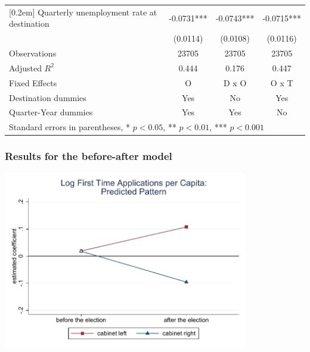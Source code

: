 \documentclass[compress, xcolor = {table,xcdraw}]{beamer}
\begin{document}
\begin{frame}
\begin{table}
\begin{tabular}{l*{3}{c}}
		[0.2em]
		Quarterly unemployment rate at destination&     -0.0731***&     -0.0743***&     -0.0715***\\
		&    (0.0114)         &    (0.0108)         &    (0.0116)         \\
		\hline
		Observations        &       23705         &       23705         &       23705         \\
		Adjusted \(R^{2}\)  &       0.444         &       0.176         &       0.447         \\
		Fixed Effects       &           O         &       D x O         &       O x T         \\
		Destination dummies &         Yes         &          No         &         Yes         \\
		Quarter-Year dummies&         Yes         &         Yes         &          No         \\
		\hline\hline
		\multicolumn{4}{l}{\tiny Standard errors in parentheses, * \(p<0.05\), ** \(p<0.01\), *** \(p<0.001\)}\\
	\end{tabular}
\end{table}
\end{frame}


\begin{frame} [t]
\frametitle{Results for the before-after model}
\begin{center}	
	\includegraphics[width=0.8\textwidth] {../paper/inputs/app_graph1_baseline.pdf}	
\end{center}
\end{frame}
\end{document}
